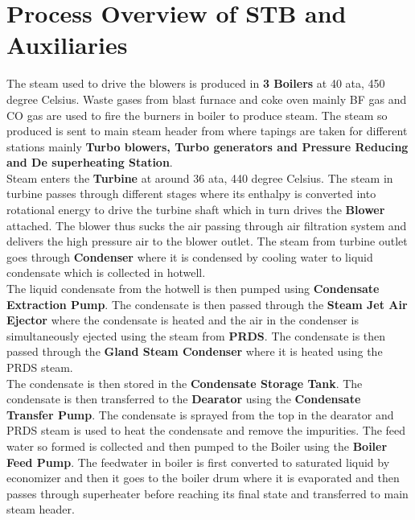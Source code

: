 \documentclass[english,11pt]{report}
\begin{document}
\section{Process Overview of STB and Auxiliaries}
The steam used to drive the blowers is produced in \textbf{3 Boilers} at 40 ata, 450 degree Celsius. Waste gases from blast furnace and coke oven mainly BF gas and CO gas are used to fire the
burners in boiler to produce steam. The steam so produced is sent to main steam header from
where tapings are taken for different stations mainly \textbf{Turbo blowers, Turbo generators and
Pressure Reducing and De superheating Station}.\\[1em]
Steam enters the \textbf{Turbine} at around 36 ata, 440 degree Celsius. The steam in turbine passes
through different stages where its enthalpy is converted into rotational energy to drive the
turbine shaft which in turn drives the \textbf{Blower} attached. The blower thus sucks the air passing through air filtration system and delivers the high pressure air to the blower outlet. The steam from turbine outlet goes through \textbf{Condenser} where it is condensed by cooling water to liquid condensate which is collected in hotwell.\\[1em]
The liquid condensate from the hotwell is then pumped using \textbf{Condensate Extraction Pump}.
The condensate is then passed through the \textbf{Steam Jet Air Ejector} where the condensate is
heated and the air in the condenser is simultaneously ejected using the steam from \textbf{PRDS}. The condensate is then passed through the \textbf{Gland Steam Condenser} where it is heated using the PRDS steam.\\[1em]
The condensate is then stored in the \textbf{Condensate Storage Tank}. The condensate is then
transferred to the \textbf{Dearator} using the \textbf{Condensate Transfer Pump}. The condensate is sprayed from the top in the dearator and PRDS steam is used to heat the condensate and remove the
impurities. The feed water so formed is collected and then pumped to the Boiler using the
\textbf{Boiler Feed Pump}. The feedwater in boiler is first converted to saturated liquid by
economizer and then it goes to the boiler drum where it is evaporated and then passes through
superheater before reaching its final state and transferred to main steam header.
\end{document}
